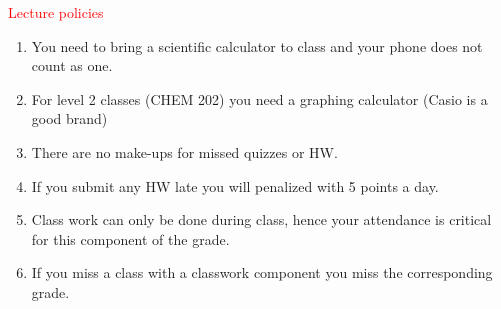 \documentclass[cover.tex]{subfiles}
\begin{document}
 


\begin{mdframed}[style=MyFrame]
\begin{center}{\textcolor{red}{\Large Lecture policies}}\end{center}
\begin{enumerate}
\item You need to bring a scientific calculator to class and your phone does not count as one.
\item For level 2 classes (CHEM 202) you need a graphing calculator (Casio is a good brand)
\item There are no make-ups for missed quizzes or HW.  
\item If you submit any HW late you will penalized with 5 points a day.
\item Class work can only be done during class, hence your attendance is critical for this component of the grade.
\item If you miss a class with a classwork component you miss the corresponding grade.
\end{enumerate}

 
    \par\noindent\makebox[1.5in]{\hrulefill}   \hfill\makebox[2.0in]{\hrulefill}    \hfill\makebox[2.0in]{\hrulefill}  \par\noindent{}    \hfill{}   \hfill{} 
 

\end{mdframed}
\end{document}
